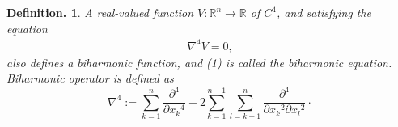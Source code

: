 \documentclass[12pt]{article}
\newtheorem{definition*}{Definition.}
\begin{document}
\begin{definition*} A real-valued function $V\colon\mathbb{R}^n\to\mathbb{R}$ of  $C^4$, and satisfying the equation 
\begin{align}
\nabla^4 V=0,
\end{align}
also defines a biharmonic function, and (1) is called the biharmonic equation. Biharmonic operator is defined as 
$$\nabla^4:=\sum_{k=1}^n\frac{\partial^4}{\partial{x_k}^4}+
2\sum_{k=1}^{n-1}\sum_{l=k+1}^n\frac{\partial^4}{\partial{x_k}^2\partial{x_l}^2}\cdot$$
\end{definition*}
\end{document}
